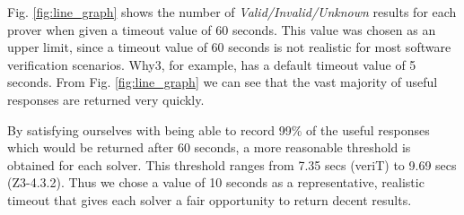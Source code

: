 %
%

Fig. \ref{fig:line_graph} shows the number of \textit{Valid/Invalid/Unknown} results for each prover when given a timeout value of 60 seconds. 
This value was chosen as an upper limit, since a timeout value of 60 seconds is not realistic for most software verification scenarios.  \textsf{Why3}, for example, has a default timeout value of 5 seconds. 
From Fig. \ref{fig:line_graph} we can see that the vast majority of useful responses are returned very quickly. 

By satisfying ourselves with being able to record 99\% of the useful responses which would be returned after 60 seconds, a more reasonable threshold is obtained for each solver. This threshold ranges from 7.35 secs (veriT) to 9.69 secs (Z3-4.3.2). Thus we chose a value of 10 seconds as a representative, realistic timeout that gives each solver a fair opportunity to return decent results.     

